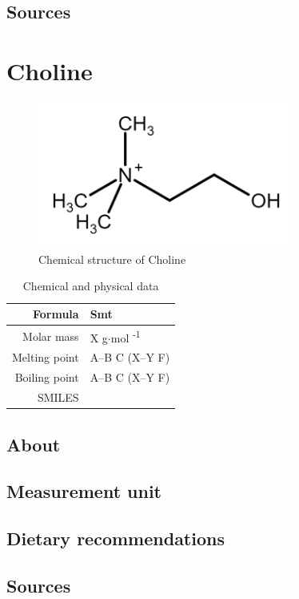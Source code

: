 \documentclass{book}
\begin{document}
\section{Sources}


\chapter{Choline}
\begin{figure}[h]
	\caption{Chemical structure of Choline}
	\centering \includegraphics[width=0.75\textwidth]{images/Choline_chemical_structure}
\end{figure}

\begin{table}[h]
	\caption{Chemical and physical data}
	\centering \begin{tabular}{| r | l |}
		\hline
		Formula & Smt\\ \hline
		Molar mass & X g$\cdot$mol \textsuperscript{-1}\\ \hline
		Melting point & A--B \degree C (X--Y \degree F)\\ \hline
		Boiling point & A--B \degree C (X--Y \degree F)\\ \hline
		SMILES & \\ \hline
	\end{tabular}
\end{table}
\newpage

\section{About}


\section{Measurement unit}


\section{Dietary recommendations}


\section{Sources}


\listoffigures


\listoftables
\end{document}
